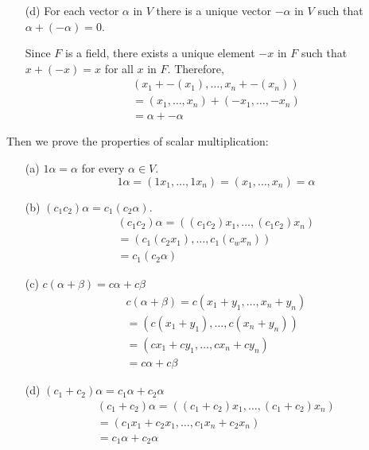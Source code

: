 \documentclass{article}
\begin{document}
\begin{enumerate}[listparindent=\parindent]
\begin{enumerate}[listparindent=\parindent]
        \item[(d)] For each vector \(\alpha\) in \(V\) there is a unique vector \(-\alpha\) in \(V\) such that \(\alpha + (-\alpha) = 0\).

            Since \(F\) is a field, there exists a unique element \(-x\) in \(F\) such that \(x + (-x) = x\) for all \(x\) in \(F\). Therefore,
            \begin{gather*}
                (x_1 + -(x_1), \dots, x_n + -(x_n)) \\
                = (x_1, \dots, x_n) + (-x_1, \dots, -x_n) \\
                = \alpha + -\alpha
            \end{gather*}
    \end{enumerate}

Then we prove the properties of scalar multiplication:
    \begin{enumerate}[listparindent=\parindent]
        \item[(a)] \(1\alpha = \alpha\) for every \(\alpha \in V\).
        \[1\alpha = (1x_1, \dots, 1x_n) = (x_1, \dots, x_n) = \alpha\]

        \item[(b)] \((c_1c_2)\alpha = c_1(c_2\alpha)\).
        \begin{gather*}
            (c_1c_2)\alpha = ((c_1c_2)x_1, \dots, (c_1c_2)x_n) \\
            = (c_1(c_2x_1), \dots, c_1(c_wx_n)) \\
            = c_1(c_2\alpha)
        \end{gather*}

        \item[(c)] \(c(\alpha + \beta) = c\alpha + c\beta\)
        \begin{gather*}
            c(\alpha + \beta) = c(x_1 + y_1, \dots, x_n + y_n) \\
            = (c(x_1 + y_1), \dots, c(x_n + y_n)) \\
            = (cx_1 + cy_1, \dots, cx_n + cy_n) \\
            = c\alpha + c\beta
        \end{gather*}

        \item[(d)] \((c_1 + c_2)\alpha = c_1\alpha + c_2\alpha\)
        \begin{gather*}
            (c_1 + c_2)\alpha = ((c_1 + c_2)x_1, \dots, (c_1 + c_2)x_n) \\
            = (c_1x_1 + c_2x_1, \dots, c_1x_n + c_2x_n) \\
            = c_1\alpha + c_2\alpha
        \end{gather*}
    \end{enumerate}


\end{enumerate}
\end{document}
